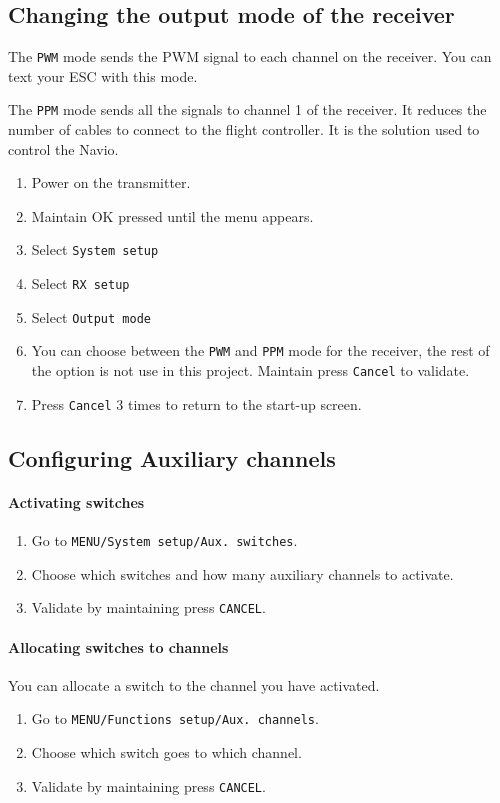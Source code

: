 \subsection{Changing the output mode of the receiver}
The \texttt{PWM} mode sends the PWM signal to each channel on the receiver. You can text your ESC with this mode.

The \texttt{PPM} mode sends all the signals to channel 1 of the receiver. It reduces the number of cables to connect to the flight controller. It is the solution used to control the Navio.

\begin{enumerate}
    \item Power on the transmitter.
    \item Maintain OK pressed until the menu appears.
    \item Select \texttt{System setup}
    \item Select \texttt{RX setup}
    \item Select \texttt{Output mode}
    \item You can choose between the \texttt{PWM} and \texttt{PPM} mode for the receiver, the rest of the option is not use in this project. Maintain press \texttt{Cancel} to validate.
    \item Press \texttt{Cancel} 3 times to return to the start-up screen.
\end{enumerate}

\subsection{Configuring Auxiliary channels}
\paragraph{Activating switches}
\begin{enumerate}
    \item Go to \texttt{MENU/System setup/Aux. switches}.
    \item Choose which switches and how many auxiliary channels to activate.
    \item Validate by maintaining press \texttt{CANCEL}.
\end{enumerate}

\paragraph{Allocating switches to channels}
You can allocate a switch to the channel you have activated.
\begin{enumerate}
    \item Go to \texttt{MENU/Functions setup/Aux. channels}.
    \item Choose which switch goes to which channel.
    \item Validate by maintaining press \texttt{CANCEL}.
\end{enumerate}

